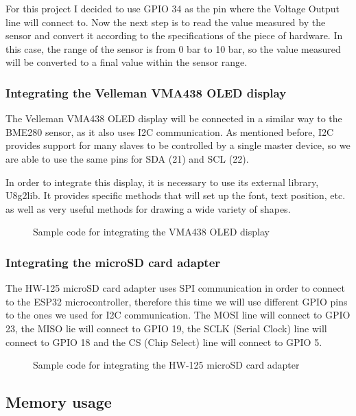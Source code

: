\documentclass[12pt]{article}
\begin{document}
For this project I decided to use GPIO 34 as the pin where the Voltage Output line will connect to. Now the next step is to read the value measured by the sensor and convert it according to the specifications of the piece of hardware. In this case, the range of the sensor is from 0 bar to 10 bar, so the value measured will be converted to a final value within the sensor range.

\subsubsection{Integrating the Velleman VMA438 OLED display}

The Velleman VMA438 OLED display will be connected in a similar way to the BME280 sensor, as it also uses I2C communication. As mentioned before, I2C provides support for many slaves to be controlled by a single master device, so we are able to use the same pins for SDA (21) and SCL (22).\par

In order to integrate this display, it is necessary to use its external library, U8g2lib. It provides specific methods that will set up the font, text position, etc. as well as very useful methods for drawing a wide variety of shapes.

\begin{figure}[h]
\label{code:oled}

\centering
\caption{Sample code for integrating the VMA438 OLED display}
\end{figure}

\subsubsection{Integrating the microSD card adapter}

The HW-125 microSD card adapter uses SPI communication in order to connect to the ESP32 microcontroller, therefore this time we will use different GPIO pins to the ones we used for I2C communication. The MOSI line will connect to GPIO 23, the MISO lie will connect to GPIO 19, the SCLK (Serial Clock) line will connect to GPIO 18 and the CS (Chip Select) line will connect to GPIO 5.

\begin{figure}[h]
\label{code:sd}

\centering
\caption{Sample code for integrating the HW-125 microSD card adapter}
\end{figure}

\subsection{Memory usage}
\end{document}
